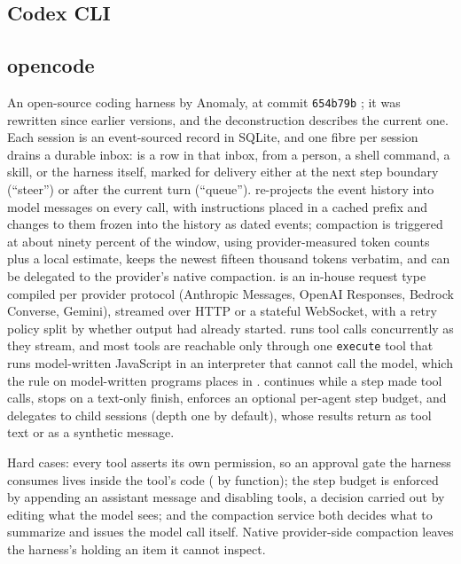 \subsection{Codex CLI}


\subsection{opencode}
An open-source coding harness by Anomaly, at commit \texttt{654b79b} \citep{opencode}; it was rewritten since earlier versions, and the deconstruction describes the current one. Each session is an event-sourced record in SQLite, and one fibre per session drains a durable inbox:  is a row in that inbox, from a person, a shell command, a skill, or the harness itself, marked for delivery either at the next step boundary (``steer'') or after the current turn (``queue'').  re-projects the event history into model messages on every call, with instructions placed in a cached prefix and changes to them frozen into the history as dated events; compaction is triggered at about ninety percent of the window, using provider-measured token counts plus a local estimate, keeps the newest fifteen thousand tokens verbatim, and can be delegated to the provider's native compaction.  is an in-house request type compiled per provider protocol (Anthropic Messages, OpenAI Responses, Bedrock Converse, Gemini), streamed over HTTP or a stateful WebSocket, with a retry policy split by whether output had already started.  runs tool calls concurrently as they stream, and most tools are reachable only through one \texttt{execute} tool that runs model-written JavaScript in an interpreter that cannot call the model, which the rule on model-written programs places in .  continues while a step made tool calls, stops on a text-only finish, enforces an optional per-agent step budget, and delegates to child sessions (depth one by default), whose results return as tool text or as a synthetic message.

Hard cases: every tool asserts its own permission, so an approval gate the harness consumes lives inside the tool's code ( by function); the step budget is enforced by appending an assistant message and disabling tools, a  decision carried out by editing what the model sees; and the compaction service both decides what to summarize and issues the model call itself. Native provider-side compaction leaves the harness's  holding an item it cannot inspect.

